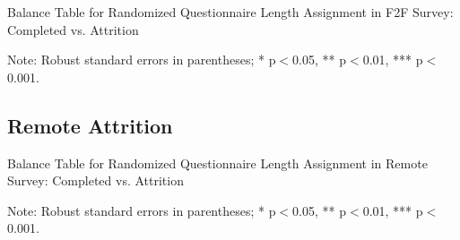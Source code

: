 \documentclass[11pt,harvard]{article}
\begin{document}
\begin{table}[htbp]
	\centering
	\begin{adjustbox}{max width=\textwidth}
		\begin{threeparttable}
			\caption{Balance Table for Randomized Questionnaire Length Assignment in F2F Survey: Completed vs. Attrition}
			\scriptsize
			 
			\label{tab:CAR_Listing_Demo_Attrition_F2F}
			\begin{tablenotes}
				\item Note: Robust standard errors in parentheses; * p$<$0.05, ** p$<$0.01, *** p$<$0.001.
			\end{tablenotes}
		\end{threeparttable}
	\end{adjustbox}
\end{table}

\pagebreak


\subsection{Remote Attrition}
\begin{table}[htbp]
	\centering
	\begin{adjustbox}{max width=\textwidth}
		\begin{threeparttable}
			\caption{Balance Table for Randomized Questionnaire Length Assignment in Remote Survey: Completed vs. Attrition}
			\scriptsize
			 
			\label{tab:CAR_Listing_Demo_Attrition_Remote}
			\begin{tablenotes}
				\item Note: Robust standard errors in parentheses; * p$<$0.05, ** p$<$0.01, *** p$<$0.001.
			\end{tablenotes}
		\end{threeparttable}
	\end{adjustbox}
\end{table}


\pagebreak











		
\end{document}
